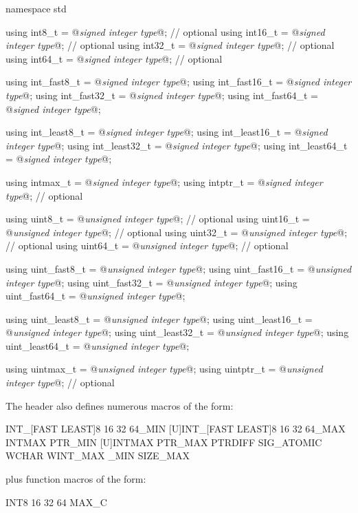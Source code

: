 \begin{codeblock}
namespace std {
  using int8_t         = @\textit{signed integer type}@;  // optional
  using int16_t        = @\textit{signed integer type}@;  // optional
  using int32_t        = @\textit{signed integer type}@;  // optional
  using int64_t        = @\textit{signed integer type}@;  // optional

  using int_fast8_t    = @\textit{signed integer type}@;
  using int_fast16_t   = @\textit{signed integer type}@;
  using int_fast32_t   = @\textit{signed integer type}@;
  using int_fast64_t   = @\textit{signed integer type}@;

  using int_least8_t   = @\textit{signed integer type}@;
  using int_least16_t  = @\textit{signed integer type}@;
  using int_least32_t  = @\textit{signed integer type}@;
  using int_least64_t  = @\textit{signed integer type}@;

  using intmax_t       = @\textit{signed integer type}@;
  using intptr_t       = @\textit{signed integer type}@;   // optional

  using uint8_t        = @\textit{unsigned integer type}@; // optional
  using uint16_t       = @\textit{unsigned integer type}@; // optional
  using uint32_t       = @\textit{unsigned integer type}@; // optional
  using uint64_t       = @\textit{unsigned integer type}@; // optional

  using uint_fast8_t   = @\textit{unsigned integer type}@;
  using uint_fast16_t  = @\textit{unsigned integer type}@;
  using uint_fast32_t  = @\textit{unsigned integer type}@;
  using uint_fast64_t  = @\textit{unsigned integer type}@;

  using uint_least8_t  = @\textit{unsigned integer type}@;
  using uint_least16_t = @\textit{unsigned integer type}@;
  using uint_least32_t = @\textit{unsigned integer type}@;
  using uint_least64_t = @\textit{unsigned integer type}@;

  using uintmax_t      = @\textit{unsigned integer type}@;
  using uintptr_t      = @\textit{unsigned integer type}@; // optional
}
\end{codeblock}

\pnum
The header also defines numerous macros of the form:
\begin{codeblock}
  INT_[FAST LEAST]{8 16 32 64}_MIN
  [U]INT_[FAST LEAST]{8 16 32 64}_MAX
  INT{MAX PTR}_MIN
  [U]INT{MAX PTR}_MAX
  {PTRDIFF SIG_ATOMIC WCHAR WINT}{_MAX _MIN}
  SIZE_MAX
\end{codeblock}
plus function macros of the form:
\begin{codeblock}
  [U]INT{8 16 32 64 MAX}_C
\end{codeblock}

